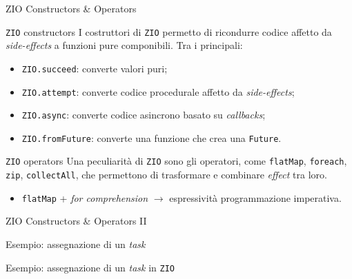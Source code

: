 \begin{frame}[fragile]{ZIO Constructors \& Operators}
  \begin{block}{\texttt{ZIO} constructors}
    I costruttori di \texttt{ZIO} permetto di ricondurre codice affetto da \textit{side-effects} a funzioni pure componibili. Tra i principali:
    \begin{itemize}
      \item \texttt{ZIO.succeed}: converte valori puri;
      \item \texttt{ZIO.attempt}: converte codice procedurale affetto da \textit{side-effects};
      \item \texttt{ZIO.async}: converte codice asincrono basato su \textit{callbacks};
      \item \texttt{ZIO.fromFuture}: converte una funzione che crea una \texttt{Future}.
    \end{itemize}
  \end{block}
  \begin{block}{\texttt{ZIO} operators}
    Una peculiarità di \texttt{ZIO} sono gli operatori, come \texttt{flatMap}, \texttt{foreach}, \texttt{zip}, \texttt{collectAll}, che permettono di trasformare e combinare \textit{effect} tra loro.
    \begin{itemize}
      \item \small\texttt{flatMap} + \textit{for comprehension} 
      $\rightarrow$ espressività programmazione imperativa.
    \end{itemize}
  \end{block}
\end{frame}

\begin{frame}[fragile]{ZIO Constructors \& Operators II}
  \begin{block}{Esempio: assegnazione di un \textit{task}}
    
  \end{block}
  \pause
  \begin{block}{Esempio: assegnazione di un \textit{task} in \texttt{ZIO}}
    
  \end{block}
\end{frame}


